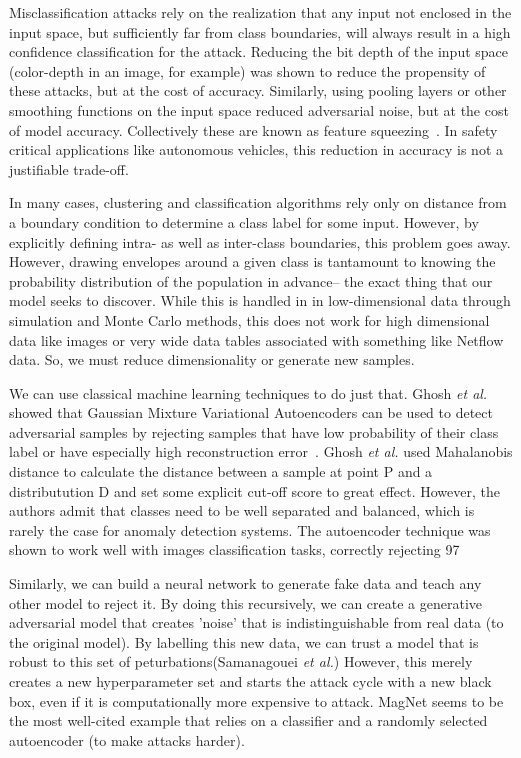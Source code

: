 Misclassification attacks rely on the realization that any input not enclosed in the input space, but sufficiently far from class boundaries, will always result in a high confidence classification for the attack. Reducing the bit depth of the input space (color-depth in an image, for example) was shown to reduce the propensity of these attacks, but at the cost of accuracy. Similarly, using pooling layers or other smoothing functions on the input space reduced adversarial noise, but at the cost of model accuracy. Collectively these are known as feature squeezing~\cite{feature_squeezing}. In safety critical applications like autonomous vehicles, this reduction in accuracy is not a justifiable trade-off. 

In many cases, clustering and classification algorithms rely only on distance from a boundary condition to determine a class label for some input. However, by explicitly defining intra- as well as inter-class boundaries, this problem goes away. However, drawing envelopes around a given class is tantamount to knowing the probability distribution of the population in advance-- the exact thing that our model seeks to discover. While this is handled in in low-dimensional data through simulation and Monte Carlo methods, this does not work for high dimensional data like images or very wide data tables associated with something like Netflow data. So, we must reduce dimensionality or generate new samples. 

We can use classical machine learning techniques to do just that. Ghosh \textit{et al.} showed that Gaussian Mixture Variational Autoencoders can be used to detect adversarial samples by rejecting samples that have low probability of their class label or have especially high reconstruction error~\cite{gho}. Ghosh \textit{et al.} used Mahalanobis distance to calculate the distance between a sample at point P and a distributution D and set some explicit cut-off score to great effect. However, the authors admit that classes need to be well separated and balanced, which is rarely the case for anomaly detection systems. The autoencoder technique was shown to work well with images classification tasks, correctly rejecting 97%

Similarly, we can build a neural network to generate fake data and teach any other model to reject it. By doing this recursively, we can create a generative adversarial model that creates 'noise' that is indistinguishable from real data (to the original model). By labelling this new data, we can trust a model that is robust to this set of peturbations(Samanagouei \textit{et al.})
However, this merely creates a new hyperparameter set and starts the attack cycle with a new black box, even if it is computationally more expensive to attack. MagNet seems to be the most well-cited example that relies on a classifier and a randomly selected autoencoder (to make attacks harder). 
